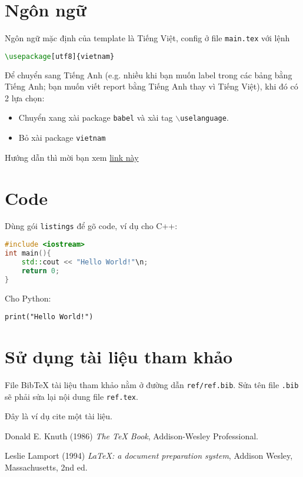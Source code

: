 \documentclass[a4paper,14pt]{article}
\begin{document}
\section{Ngôn ngữ}
Ngôn ngữ mặc định của template là Tiếng Việt, config ở file \texttt{main.tex} với lệnh
\begin{lstlisting}[language=tex]
	\usepackage[utf8]{vietnam}
\end{lstlisting}
Để chuyển sang Tiếng Anh (e.g. nhiều khi bạn muốn label trong các bảng bằng Tiếng Anh; bạn muốn viết report bằng Tiếng Anh thay vì Tiếng Việt), khi đó có 2 lựa chọn:
\begin{itemize}
	\item Chuyển xang xài package \texttt{babel} và xài tag \texttt{$\backslash$uselanguage}.
	\item Bỏ xài package \texttt{vietnam}
\end{itemize}
Hướng dẫn thì mời bạn xem \href{https://www.overleaf.com/learn/latex/International_language_support#Babel}{link này}

\section{Code}
Dùng gói \texttt{listings} để gõ code, ví dụ cho C++:
\begin{lstlisting}[language=C++]
#include <iostream>
int main(){
	std::cout << "Hello World!"\n;
	return 0;
}
\end{lstlisting}

Cho Python:
\begin{lstlisting}[label=Python]
	print("Hello World!")
\end{lstlisting}

\section{Sử dụng tài liệu tham khảo}

File BibTeX tài liệu tham khảo nằm ở đường dẫn \texttt{ref/ref.bib}. Sửa tên file \texttt{.bib} sẽ phải sửa lại nội dung file \texttt{ref.tex}.

Đây là ví dụ cite một tài liệu\cite{texbook}\cite{lamport94}.


\cleardoublepage
{}
{}

\begin{thebibliography}{9}
	Donald E. Knuth (1986) \emph{The \TeX{} Book}, Addison-Wesley Professional.
	
	Leslie Lamport (1994) \emph{\LaTeX: a document preparation system}, Addison
	Wesley, Massachusetts, 2nd ed.
\end{thebibliography}
\end{document}
